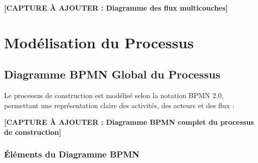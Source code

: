 \textbf{[CAPTURE À AJOUTER : Diagramme des flux multicouches]}

\section{Modélisation du Processus}

\subsection{Diagramme BPMN Global du Processus}

Le processus de construction est modélisé selon la notation BPMN 2.0, permettant une représentation claire des activités, des acteurs et des flux :

\textbf{[CAPTURE À AJOUTER : Diagramme BPMN complet du processus de construction]}

\subsubsection{Éléments du Diagramme BPMN}

